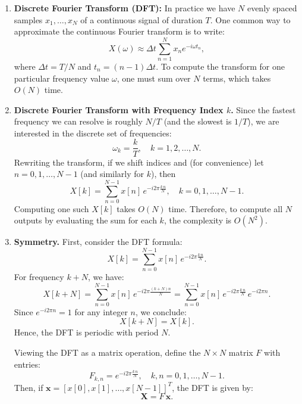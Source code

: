\documentclass[letterpaper, 11pt]{article}
\newcommand{\1}{\mathds{1}}	%
\theoremstyle{definition}
\newenvironment{solution}{{\par\noindent\it Solution.}}{}
\begin{document}
\begin{solution}
\begin{enumerate}[label=\arabic*.]
        \item \textbf{Discrete Fourier Transform (DFT):}  
        In practice we have $N$ evenly spaced samples $x_1, \ldots, x_N$ of a continuous signal of duration $T$. One common way to approximate the continuous Fourier transform is to write:
        \[
        X(\omega) \approx \Delta t \sum_{n=1}^{N} x_n e^{-i\omega t_n},
        \]
        where $\Delta t = T/N$ and $t_n = (n-1)\Delta t$.  
        To compute the transform for one particular frequency value $\omega$, one must sum over $N$ terms, which takes $O(N)$ time.
    
        \item \textbf{Discrete Fourier Transform with Frequency Index $k$.}  
        Since the fastest frequency we can resolve is roughly $N/T$ (and the slowest is $1/T$), we are interested in the discrete set of frequencies:
        \[
        \omega_k = \frac{k}{T},\quad k = 1,2,\ldots, N.
        \]
        Rewriting the transform, if we shift indices and (for convenience) let $n = 0,1,\ldots, N-1$ (and similarly for $k$), then
        \[
        X[k] = \sum_{n=0}^{N-1} x[n] \, e^{-i2\pi \frac{k\,n}{N}},\quad k = 0,1,\ldots,N-1.
        \]
        Computing one such $X[k]$ takes $O(N)$ time. Therefore, to compute all $N$ outputs by evaluating the sum for each $k$, the complexity is $O(N^2)$.
    
        \item \textbf{Symmetry.}  
        First, consider the DFT formula:
        \[
        X[k] = \sum_{n=0}^{N-1} x[n] \, e^{-i2\pi \frac{k\,n}{N}}.
        \]
        For frequency $k+N$, we have:
        \[
        X[k+N] = \sum_{n=0}^{N-1} x[n] \, e^{-i2\pi \frac{(k+N)n}{N}}
        = \sum_{n=0}^{N-1} x[n] \, e^{-i2\pi \frac{k\,n}{N}}\, e^{-i2\pi n}.
        \]
        Since $e^{-i2\pi n} = 1$ for any integer $n$, we conclude:
        \[
        X[k+N] = X[k].
        \]
        Hence, the DFT is periodic with period $N$.  
    
        \medskip
        Viewing the DFT as a matrix operation, define the $N\times N$ matrix $F$ with entries:
        \[
        F_{k,n} = e^{-i2\pi \frac{k\,n}{N}},\quad k,n=0,1,\ldots,N-1.
        \]
        Then, if $\mathbf{x} = [x[0], x[1],\ldots,x[N-1]]^T$, the DFT is given by:
        \[
        \mathbf{X} = F\, \mathbf{x}.
        \]
    

\end{enumerate}
\end{solution}
\end{document}
